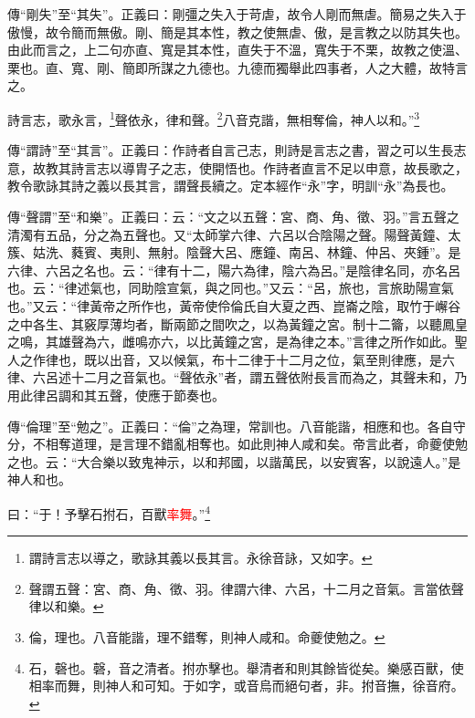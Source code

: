 {\noindent\zhuan{}\fzbyks 傳“剛失”至“其失”。正義曰：剛彊之失入于苛虐，故令人剛而無虐。簡易之失入于傲慢，故令簡而無傲。剛、簡是其本性，教之使無虐、傲，是言教之以防其失也。由此而言之，上二句亦直、寬是其本性，直失于不溫，寬失于不栗，故教之使溫、栗也。直、寬、剛、簡即所謀之九德也。九德而獨舉此四事者，人之大體，故特言之。 \par}

詩言志，歌永言，\footnote{謂詩言志以導之，歌詠其義以長其言。永徐音詠，又如字。}聲依永，律和聲。\footnote{聲謂五聲：宮、商、角、徵、羽。律謂六律、六呂，十二月之音氣。言當依聲律以和樂。}八音克諧，無相奪倫，神人以和。”\footnote{倫，理也。八音能諧，理不錯奪，則神人咸和。命夔使勉之。}

{\noindent\zhuan{}\fzbyks 傳“謂詩”至“其言”。正義曰：作詩者自言己志，則詩是言志之書，習之可以生長志意，故教其詩言志以導胄子之志，使開悟也。作詩者直言不足以申意，故長歌之，教令歌詠其詩之義以長其言，謂聲長續之。定本經作“永”字，明訓“永”為長也。 \par}

{\noindent\zhuan{}\fzbyks 傳“聲謂”至“和樂”。正義曰：云：“文之以五聲：宮、商、角、徵、羽。”言五聲之清濁有五品，分之為五聲也。又“太師掌六律、六呂以合陰陽之聲。陽聲黃鐘、太簇、姑洗、蕤賓、夷則、無射。陰聲大呂、應鐘、南呂、林鐘、仲呂、夾鍾”。是六律、六呂之名也。云：“律有十二，陽六為律，陰六為呂。”是陰律名同，亦名呂也。云：“律述氣也，同助陰宣氣，與之同也。”又云：“呂，旅也，言旅助陽宣氣也。”又云：“律黃帝之所作也，黃帝使伶倫氏自大夏之西、崑崙之陰，取竹于嶰谷之中各生、其竅厚薄均者，斷兩節之間吹之，以為黃鐘之宮。制十二籥，以聽鳳皇之鳴，其雄聲為六，雌鳴亦六，以比黃鐘之宮，是為律之本。”言律之所作如此。聖人之作律也，既以出音，又以候氣，布十二律于十二月之位，氣至則律應，是六律、六呂述十二月之音氣也。“聲依永”者，謂五聲依附長言而為之，其聲未和，乃用此律呂調和其五聲，使應于節奏也。 \par}

{\noindent\zhuan{}\fzbyks 傳“倫理”至“勉之”。正義曰：“倫”之為理，常訓也。八音能諧，相應和也。各自守分，不相奪道理，是言理不錯亂相奪也。如此則神人咸和矣。帝言此者，命夔使勉之也。云：“大合樂以致鬼神示，以和邦國，以諧萬民，以安賓客，以說遠人。”是神人和也。 \par}

曰：“于！予擊石拊石，百獸\textcolor{red}{率舞}。”\footnote{石，磬也。磬，音之清者。拊亦擊也。舉清者和則其餘皆從矣。樂感百獸，使相率而舞，則神人和可知。于如字，或音烏而絕句者，非。拊音撫，徐音府。}

